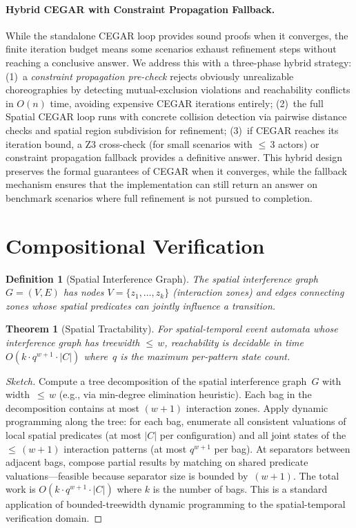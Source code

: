 \documentclass[11pt,a4paper]{article}
\newtheorem{theorem}{Theorem}
\newtheorem{definition}{Definition}
\begin{document}
\paragraph{Hybrid CEGAR with Constraint Propagation Fallback.}
While the standalone CEGAR loop provides sound proofs when it converges,
the finite iteration budget means some scenarios exhaust refinement steps
without reaching a conclusive answer.
We address this with a three-phase hybrid strategy:
(1)~a \emph{constraint propagation pre-check} rejects obviously unrealizable
choreographies by detecting mutual-exclusion violations and reachability
conflicts in $O(n)$ time, avoiding expensive CEGAR iterations entirely;
(2)~the full Spatial CEGAR loop runs with concrete collision detection via
pairwise distance checks and spatial region subdivision for refinement;
(3)~if CEGAR reaches its iteration bound, a Z3 cross-check (for small
scenarios with ${\leq}\,3$ actors) or constraint propagation fallback
provides a definitive answer.
This hybrid design preserves the formal guarantees of CEGAR when it
converges, while the fallback mechanism ensures that the implementation
can still return an answer on benchmark scenarios where full refinement
is not pursued to completion.

\section{Compositional Verification}\label{sec:compositional}

\begin{definition}[Spatial Interference Graph]
The \emph{spatial interference graph} $G = (V, E)$ has nodes $V = \{z_1, \ldots, z_k\}$
(interaction zones) and edges connecting zones whose spatial predicates can jointly
influence a transition.
\end{definition}

\begin{theorem}[Spatial Tractability]\label{thm:tractability}
For spatial-temporal event automata whose interference graph has treewidth
${\leq}\,w$, reachability is decidable in time $O(k \cdot q^{w+1} \cdot |C|)$
where~$q$ is the maximum per-pattern state count.
\end{theorem}

\begin{proof}[Sketch]
Compute a tree decomposition of the spatial interference graph~$G$ with
width~${\leq}\,w$ (e.g., via min-degree elimination heuristic).
Each bag in the decomposition contains at most $(w{+}1)$ interaction zones.
Apply dynamic programming along the tree: for each bag, enumerate all
consistent valuations of local spatial predicates (at most $|C|$ per
configuration) and all joint states of the ${\leq}\,(w{+}1)$ interaction
patterns (at most $q^{w+1}$ per bag).
At separators between adjacent bags, compose partial results by matching on
shared predicate valuations---feasible because separator size is bounded
by~$(w{+}1)$.
The total work is $O(k \cdot q^{w+1} \cdot |C|)$ where $k$ is the number of
bags.
This is a standard application of bounded-treewidth dynamic programming
to the spatial-temporal verification
domain.
\end{proof}
\end{document}
